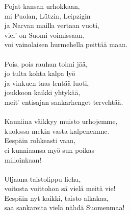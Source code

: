
Pojat kansan urhokkaan, \\ mi Puolan, Lützin, Leipzigin \\ ja Narvan mailla vertaan vuoti, \\ viel' on Suomi voimissaan, \\ voi vainolaisen hurmehella peittää maan. \\ \hspace{10mm} \\ Pois, pois rauhan toimi jää, \\ jo tulta kohta kalpa lyö \\ ja vinkuen taas lentää luoti, \\ joukkoon kaikki yhtykää, \\ meit' entisajan sankarhenget tervehtää. \\ \hspace{10mm} \\ Kauniina väikkyy muisto urhojemme, \\ kuolossa mekin vasta kalpenemme. \\ Eespäin rohkeasti vaan, \\ ei kunniaansa myö sun poikas \\ milloinkaan! \\ \hspace{10mm} \\ Uljaana taistolippu liehu, \\ voitosta voittohon sä vielä meitä vie! \\ Eespäin nyt kaikki, taisto alkakaa, \\ saa sankareita vielä nähdä Suomenmaa!